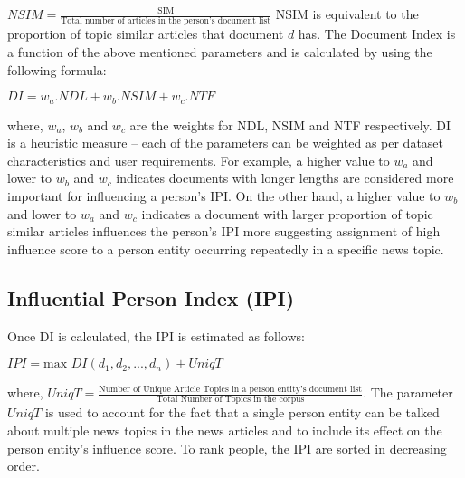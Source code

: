 $NSIM= \frac{\text{SIM}} {\text{Total number of articles in the person's document list}}$
NSIM is equivalent to the proportion of topic similar articles that document $d$ has.
The Document Index is a function of the above mentioned parameters and is calculated by using the following formula:
\begin{center}

			$DI = w_a . NDL + w_b . NSIM + w_c . NTF $
\end{center}
where, $w_a$, $ w_b$ and $w_c$ are the weights for NDL, NSIM and NTF respectively.
DI is a heuristic measure -- each of the parameters can be weighted as per dataset characteristics and user requirements. For example, a higher value to $w_a$ and lower to $w_b$ and $w_c$ indicates documents with longer lengths are considered more important for influencing a person's IPI. On the other hand, a higher value to $w_b$ and lower to $w_a$ and $w_c$ indicates a document with larger proportion of topic similar articles influences the person's IPI more suggesting assignment of high influence score to a person entity occurring repeatedly in a specific news topic.  

\subsection{Influential Person Index (IPI)}

Once DI is calculated, the IPI is estimated as follows:
		
\begin{center}
$IPI= \text{max } DI(d_1, d_2, ...,d_n)+ UniqT$
\end{center}

where, $UniqT = \frac{\text{Number of Unique Article Topics in a person entity's document list}}{\text{Total Number of Topics in the corpus}}$. The parameter $UniqT$  is used to account for the fact that a single person entity can be talked about multiple news topics in the news articles and to include its effect on the person entity's influence score. %
To rank people, the IPI are sorted in decreasing order. %
  
